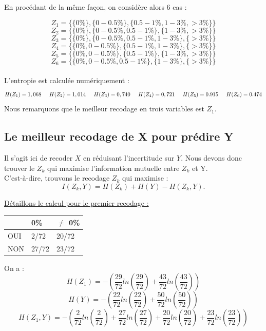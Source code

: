 \documentclass{article}
\begin{document}
En procédant de la même façon, on considère alors 6 cas :

\[
Z_1 =\{ \{0 \% \} , \{0 - 0.5 \%\} ,\{0.5-1 \% ,1-3 \% ,>3 \% \} \}  
\]
\[
  Z_2 =\{ \{0 \% \} , \{0 - 0.5\%, 0.5-1 \% \} ,\{1-3 \% ,>3 \% \} \}
\]
\[
  Z_3 =\{ \{0 \% \} , \{0 - 0.5\%, 0.5-1 \% ,1-3 \%  \} ,\{>3 \% \} \}
\]
\[
  Z_4 =\{ \{0 \%, 0 - 0.5\%\} , \{ 0.5-1 \% ,1-3 \%  \} ,\{>3 \% \} \}
\]
\[
  Z_5 =\{ \{0 \%, 0 - 0.5\%\} , \{ 0.5-1 \% \} ,\{1-3 \% , >3 \% \} \}
\]
\[
  Z_6 =\{ \{0 \%, 0 - 0.5\%,  0.5-1 \% \} , \{1-3 \%  \} ,\{>3 \% \} \}
\]
\\
L'entropie est calculée numériquement :
\[
H(Z_1) = 1,068 \hspace{0.5cm} H(Z_2) = 1,014 \hspace{0.5cm} H(Z_3) = 0,740 \hspace{0.5cm} H(Z_4) = 0,721 \hspace{0,5cm} H(Z_5) = 0.915 \hspace{0,5 cm} H(Z_6) = 0.474
\]
Nous remarquons que le meilleur recodage en trois variables est $Z_1$.

\subsection{Le meilleur recodage de X pour prédire Y }

Il s'agit ici de recoder $X$ en réduisant l'incertitude sur $Y$.
Nous devons donc trouver le $Z_k$ qui maximise l'information mutuelle entre $Z_k$ et Y.
\\
C'est-à-dire, trouvons le recodage $Z_k$ qui maximise :
\[
I(Z_k,Y) = H(Z_k) + H(Y) - H(Z_k,Y).
\]

\underline{Détaillons le calcul pour le premier recodage :}

\begin{table}[H]
  \centering
  \begin{tabular}{|l|l|l|}
  \hline
      & 0\%   & $\neq$ 0\% \\ \hline
  OUI & 2/72  & 20/72 \\ \hline
  NON & 27/72 & 23/72 \\ \hline
  \end{tabular}
  \end{table}


  On a :
\[
H(Z_1)= -\left(\frac{29}{72}ln(\frac{29}{72})+\frac{43}{72}ln(\frac{43}{72})\right)
\]
\[
H(Y)=-\left(\frac{22}{72}ln(\frac{22}{72})+\frac{50}{72}ln(\frac{50}{72})\right)
\]
\[
H(Z_1,Y)=-\left(\frac{2}{72}ln(\frac{2}{72})+\frac{27}{72}ln(\frac{27}{72})+\frac{20}{72}ln(\frac{20}{72})+\frac{23}{72}ln(\frac{23}{72})\right)
\]
\end{document}

